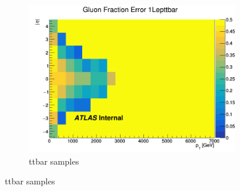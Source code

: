 \begin{figure}[p]
\begin{subfigure}[b]{0.3\textwidth}
        \centering
        \includegraphics[width=\textwidth]{figures/QGfrac/GluonFracError2D_1Lepttbar.png}
        \caption{ttbar samples}
        \label{fig:GluonFracErrorttbar}
    \end{subfigure}

    \bigskip


\end{figure}
